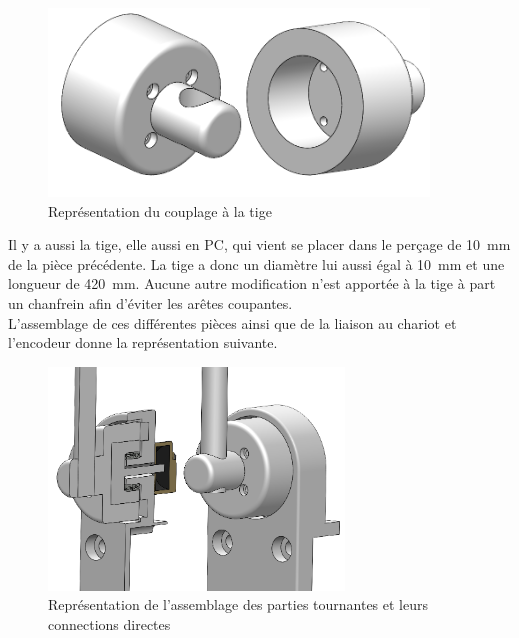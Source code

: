 \begin{figure}[H]
  \centering
  \includegraphics[width = 0.9\textwidth]{assets/figures/CouplageTige.png}
  \caption{Représentation du couplage à la tige}
  \label{fig:CouplTige}
\end{figure}

Il y a aussi la tige, elle aussi en \acrshort{PC}, qui vient se placer dans le perçage de 10~mm de la pièce précédente. La tige a donc un
diamètre lui aussi égal à 10~mm et une longueur de 420~mm. Aucune autre modification n'est apportée à la tige à part un chanfrein afin d'éviter
les arêtes coupantes.\\

L'assemblage de ces différentes pièces ainsi que de la liaison au chariot et l'encodeur donne la représentation suivante.

\begin{figure}[H]
  \centering
  \includegraphics[width = 0.7\textwidth]{assets/figures/AssemblagePartieTournante.png}
  \caption{Représentation de l'assemblage des parties tournantes et leurs connections directes}
  \label{fig:AssPartieTour}
\end{figure}



